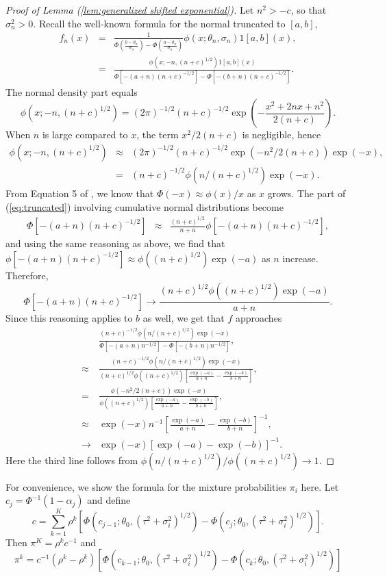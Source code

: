 \documentclass[article]{ajs}
\numberwithin{equation}{section}
\numberwithin{figure}{section}
\theoremstyle{plain}
\theoremstyle{definition}
\theoremstyle{definition}
\theoremstyle{plain}
\begin{document}
\begin{proof}[Proof of Lemma (\ref{lem:generalized shifted exponential})]
\label{proof:generalized shifted exponential}Let $n^{2}>-c$, so
that $\sigma_{n}^{2}>0$. Recall the well-known formula for the normal
truncated to $[a,b]$,
\begin{eqnarray}
f_{n}(x) & = & \frac{1}{\Phi\left(\frac{b-\theta_{n}}{\sigma_{n}}\right)-\Phi\left(\frac{a-\theta_{n}}{\sigma_{n}}\right)}\phi(x;\theta_{n},\sigma_{n})1[a,b](x),\label{eq:truncated}\\
 & = & \frac{\phi(x;-n,(n+c)^{1/2})1[a,b](x)}{\Phi[-(a+n)(n+c)^{-1/2}]-\Phi[-(b+n)(n+c)^{-1/2}]}.\nonumber 
\end{eqnarray}
The normal density part equals
\[
\phi(x;-n,(n+c)^{1/2})=(2\pi)^{-1/2}(n+c)^{-1/2}\exp\left(-\frac{x^{2}+2nx+n^{2}}{2(n+c)}\right).
\]
When $n$ is large compared to $x$, the term $x^{2}/2(n+c)$ is negligible,
hence
\begin{eqnarray*}
\phi(x;-n,(n+c)^{1/2}) & \approx & (2\pi)^{-1/2}(n+c)^{-1/2}\exp(-n^{2}/2(n+c))\exp(-x),\\
 & = & (n+c)^{-1/2}\phi(n/(n+c)^{1/2})\exp(-x).
\end{eqnarray*}
From Equation 5 of \citet{borjesson1979simple}, we know that $\Phi(-x)\approx\phi(x)/x$
as $x$ grows. The part of (\ref{eq:truncated}) involving cumulative
normal distributions become
\begin{eqnarray*}
\Phi[-(a+n)(n+c)^{-1/2}] & \approx & \frac{(n+c)^{1/2}}{n+a}\phi[-(a+n)(n+c)^{-1/2}],
\end{eqnarray*}
and using the same reasoning as above, we find that $\phi[-(a+n)(n+c)^{-1/2}]\approx\phi((n+c)^{1/2})\exp(-a)$
as $n$ increase. Therefore,
\[
\Phi[-(a+n)(n+c)^{-1/2}]\to\frac{(n+c)^{1/2}\phi((n+c)^{1/2})\exp(-a)}{a+n}.
\]
Since this reasoning applies to $b$ as well, we get that $f$ approaches
\begin{eqnarray*}
 &  & \frac{(n+c)^{-1/2}\phi(n/(n+c)^{1/2})\exp(-x)}{\Phi[-(a+n)n^{-1/2}]-\Phi[-(b+n)n^{-1/2}]},\\
 & \approx & \frac{(n+c)^{-1/2}\phi(n/(n+c)^{1/2})\exp(-x)}{(n+c)^{1/2}\phi((n+c)^{1/2})\left[\frac{\exp(-a)}{a+n}-\frac{\exp(-b)}{b+n}\right]},\\
 & = & \frac{\phi(-n^{2}/2(n+c))\exp(-x)}{\phi((n+c)^{1/2})\left[\frac{\exp(-a)}{a+n}-\frac{\exp(-b)}{b+n}\right]},\\
 & \approx & \exp(-x)n^{-1}\left[\frac{\exp(-a)}{a+n}-\frac{\exp(-b)}{b+n}\right]^{-1},\\
 & \to & \exp(-x)\left[\exp(-a)-\exp(-b)\right]^{-1}.
\end{eqnarray*}
Here the third line follows from $\phi(n/(n+c)^{1/2})/\phi((n+c)^{1/2})\to1$.
\end{proof}
For convenience, we show the formula for the mixture probabilities
$\pi_{i}$ here. Let $c_{j}=\Phi^{-1}(1-\alpha_{j})$ and define 
\[
c=\sum_{k=1}^{K}\rho^{k}[\Phi(c_{j-1};\theta_{0},(\tau^{2}+\sigma_{i}^{2})^{1/2})-\Phi(c_{j};\theta_{0},(\tau^{2}+\sigma_{i}^{2})^{1/2})].
\]
Then $\pi^{K}=\rho^{k}c^{-1}$ and \label{eq:pi_i formula}
\[
\pi^{k}=c^{-1}(\rho^{k}-\rho^{k})[\Phi(c_{k-1};\theta_{0},(\tau^{2}+\sigma_{i}^{2})^{1/2})-\Phi(c_{k};\theta_{0},(\tau^{2}+\sigma_{i}^{2})^{1/2})]
\]


\end{document}
